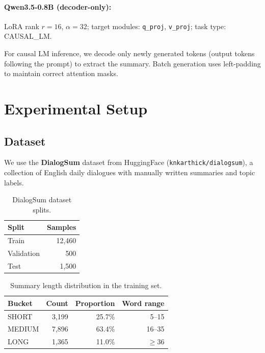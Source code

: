 \documentclass[11pt,a4paper]{article}
\begin{document}
\paragraph{Qwen3.5-0.8B (decoder-only):}
LoRA rank $r{=}16$, $\alpha{=}32$; target modules: \texttt{q\_proj}, \texttt{v\_proj}; task type: CAUSAL\_LM.

For causal LM inference, we decode only newly generated tokens (output tokens following the prompt) to extract the summary.
Batch generation uses left-padding to maintain correct attention masks.

\section{Experimental Setup}

\subsection{Dataset}\label{sec:dataset}

We use the \textbf{DialogSum} dataset from HuggingFace (\texttt{knkarthick/dialogsum}), a collection of English daily dialogues with manually written summaries and topic labels.

\begin{table}[t]
\centering
\caption{DialogSum dataset splits.}
\label{tab:splits}
\small
\begin{tabular}{@{}lr@{}}
\toprule
\textbf{Split} & \textbf{Samples} \\
\midrule
Train      & 12,460  \\
Validation & 500     \\
Test       & 1,500   \\
\bottomrule
\end{tabular}
\end{table}

\begin{table}[t]
\centering
\caption{Summary length distribution in the training set.}
\label{tab:length-dist}
\small
\begin{tabular}{@{}lrrr@{}}
\toprule
\textbf{Bucket} & \textbf{Count} & \textbf{Proportion} & \textbf{Word range} \\
\midrule
SHORT  & 3,199 & 25.7\% & 5--15 \\
MEDIUM & 7,896 & 63.4\% & 16--35 \\
LONG   & 1,365 & 11.0\% & $\geq$36 \\
\bottomrule
\end{tabular}
\end{table}
\end{document}
